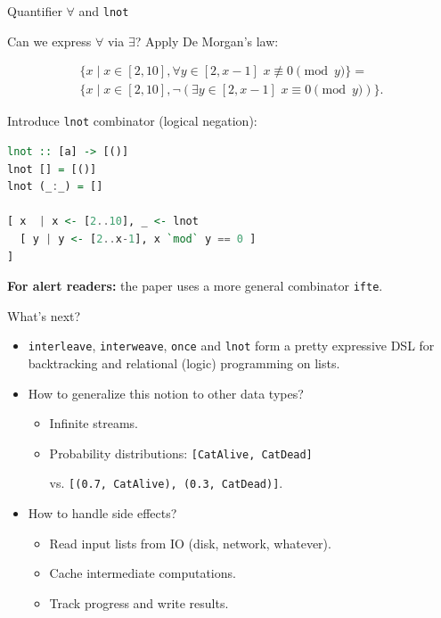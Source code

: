 \documentclass[handout]{beamer}
\begin{document}
\begin{frame}[fragile]{Quantifier $\forall$ and {\tt lnot}}

Can we express $\forall$ via $\exists$? Apply De Morgan's law:

\begin{multline*}
\bigl\{ x \mid x \in [2, 10], \forall y \in [2, x-1] \,\, x \not\equiv 0 \!\!\! \pmod y \bigr\} = \\
\bigl\{ x \mid x \in [2, 10], \neg (\exists y \in [2, x-1] \,\, x \equiv 0 \!\!\! \pmod y) \bigr\}.
\end{multline*}

\pause

Introduce {\tt lnot} combinator (logical negation):

\begin{lstlisting}[language=Haskell]
lnot :: [a] -> [()]
lnot [] = [()]
lnot (_:_) = []

[ x  | x <- [2..10], _ <- lnot
  [ y | y <- [2..x-1], x `mod` y == 0 ]
]
\end{lstlisting}

{\bf For alert readers:} the paper uses a more general combinator {\tt ifte}.

\end{frame}

\begin{frame}{What's next?}

\begin{itemize}[<+->]
\item {\tt interleave}, {\tt interweave}, {\tt once} and {\tt lnot}
      form a pretty expressive DSL for backtracking and relational (logic) programming
      on lists.
\item How to generalize this notion to other data types?
\begin{itemize}
  \item Infinite streams.
  \item Probability distributions:
        {\tt [CatAlive, CatDead]} \par vs.
        {\tt [(0.7, CatAlive), (0.3, CatDead)]}.
\end{itemize}
\item How to handle side effects?
\begin{itemize}
  \item Read input lists from IO (disk, network, whatever).
  \item Cache intermediate computations.
  \item Track progress and write results.
\end{itemize}
\end{itemize}

\end{frame}
\end{document}
